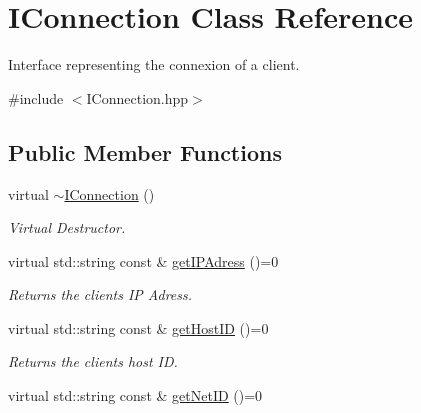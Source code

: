 \hypertarget{class_i_connection}{}\section{I\+Connection Class Reference}
\label{class_i_connection}


Interface representing the connexion of a client.  




{\ttfamily \#include $<$I\+Connection.\+hpp$>$}

\subsection*{Public Member Functions}
\begin{DoxyCompactItemize}
\item 
\hypertarget{class_i_connection_a726589aeeff7948dea5a87c263e867dd}{}virtual \hyperlink{class_i_connection_a726589aeeff7948dea5a87c263e867dd}{$\sim$\+I\+Connection} ()\label{class_i_connection_a726589aeeff7948dea5a87c263e867dd}

\begin{DoxyCompactList}\small\item\em Virtual Destructor. \end{DoxyCompactList}\item 
\hypertarget{class_i_connection_a8812ae35dc3bada3bd961edb045c590b}{}virtual std\+::string const \& \hyperlink{class_i_connection_a8812ae35dc3bada3bd961edb045c590b}{get\+I\+P\+Adress} ()=0\label{class_i_connection_a8812ae35dc3bada3bd961edb045c590b}

\begin{DoxyCompactList}\small\item\em Returns the client\textquotesingle{}s I\+P Adress. \end{DoxyCompactList}\item 
\hypertarget{class_i_connection_ab87c32c04e1bbf322ab25bd7f752afcb}{}virtual std\+::string const \& \hyperlink{class_i_connection_ab87c32c04e1bbf322ab25bd7f752afcb}{get\+Host\+I\+D} ()=0\label{class_i_connection_ab87c32c04e1bbf322ab25bd7f752afcb}

\begin{DoxyCompactList}\small\item\em Returns the client\textquotesingle{}s host I\+D. \end{DoxyCompactList}\item 
\hypertarget{class_i_connection_a884aa2cf39ab4e58f5cdf79cb5eed99d}{}virtual std\+::string const \& \hyperlink{class_i_connection_a884aa2cf39ab4e58f5cdf79cb5eed99d}{get\+Net\+I\+D} ()=0\label{class_i_connection_a884aa2cf39ab4e58f5cdf79cb5eed99d}


\end{DoxyCompactItemize}
